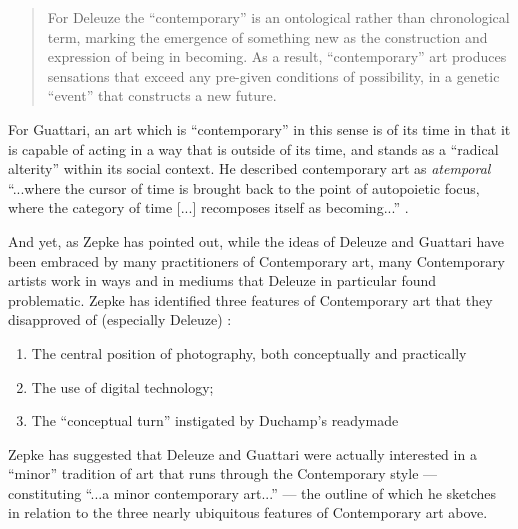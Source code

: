         \begin{quote}
            For Deleuze the “contemporary” is an ontological rather than chronological term, marking the emergence of something new as the construction and expression of being in becoming. As a result, “contemporary” art produces sensations that exceed any pre-given conditions of possibility, in a genetic “event” that constructs a new future. \citep[p.63]{ZepkeOSullivanDlzCntmprryArt2010}
        \end{quote}

        For Guattari, an art which is “contemporary” in this sense is of its time in that it is capable of acting in a way that is outside of its time, and stands as a “radical alterity” \citep[p.64]{ZepkeOSullivanDlzCntmprryArt2010} within its social context. He described contemporary art as \emph{atemporal} “...where the cursor of time is brought back to the point of autopoietic focus, where the category of time [...] recomposes itself as becoming...” \citep[p.18]{GuattariOlivierFlxGttrEtLArtCntmprn1994}.
        
        And yet, as Zepke has pointed out, while the ideas of Deleuze and Guattari have been embraced by many practitioners of Contemporary art, many Contemporary artists work in ways and in mediums that Deleuze in particular found problematic. Zepke has identified three features of Contemporary art that they disapproved of (especially Deleuze) \citep[p.751]{ZepkeAWrkOfArt2017}:

        \begin{enumerate}
            \item The central position of photography, both conceptually and practically
            \item The use of digital technology;
            \item The “conceptual turn” instigated by Duchamp's readymade
        \end{enumerate}

        Zepke has suggested that Deleuze and Guattari were actually interested in a “minor” tradition of art that runs through the Contemporary style — constituting “...a minor contemporary art...” \citep[p.751]{ZepkeAWrkOfArt2017} — the outline of which he sketches in relation to the three nearly ubiquitous features of Contemporary art above.

